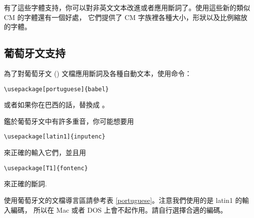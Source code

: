 有了這些字體支持，你可以對非英文文本改進或者應用斷詞了。使用這些新的類似 CM 的字體還有一個好處，
它們提供了 CM 字族裡各種大小，形狀以及比例縮放的字體。

\subsection{葡萄牙文支持}

為了對葡萄牙文 () 文檔應用斷詞及各種自動文本，使用命令：
\begin{lscommand}
\verb|\usepackage[portuguese]{babel}|
\end{lscommand}
或者如果你在巴西的話，替換成 \texttt{}。

鑑於葡萄牙文中有許多重音，你可能想要用
\begin{lscommand}
\verb|\usepackage[latin1]{inputenc}|
\end{lscommand}
\noindent 來正確的輸入它們，並且用
\begin{lscommand}
\verb|\usepackage[T1]{fontenc}|
\end{lscommand}
\noindent 來正確的斷詞.

使用葡萄牙文的文檔導言區請參考表 \ref{portuguese}。注意我們使用的是 latin1 的輸入編碼，
所以在 Mac 或者 DOS 上會不起作用。請自行選擇合適的編碼。

